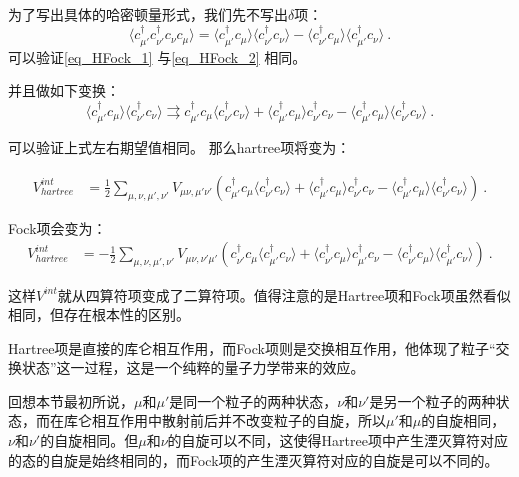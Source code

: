 为了写出具体的哈密顿量形式，我们先不写出$\delta$项：
\begin{equation}\label{eq_HFock_2}
\langle c_{\mu'}^\dagger c_{\nu'}^\dagger c_{\nu} c_{\mu} \rangle = \langle c_{\mu'}^\dagger c_\mu\rangle\langle c_{\nu'}^\dagger c_\nu\rangle-\langle c_{\nu'}^\dagger c_\mu\rangle\langle c_{\mu'}^\dagger c_\nu\rangle~.
\end{equation}
可以验证\autoref{eq_HFock_1} 与\autoref{eq_HFock_2} 相同。

并且做如下变换：
$$\langle c_{\mu'}^\dagger c_\mu\rangle\langle c_{\nu'}^\dagger c_\nu\rangle\rightrightarrows c_{\mu'}^\dagger c_\mu\langle c_{\nu'}^\dagger c_\nu\rangle+\langle c_{\mu'}^\dagger c_\mu\rangle c_{\nu'}^\dagger c_\nu-\langle c_{\mu'}^\dagger c_\mu\rangle\langle c_{\nu'}^\dagger c_\nu\rangle ~.$$

可以验证上式左右期望值相同。
那么hartree项将变为：

\begin{equation}
\begin{aligned}
V^{int}_{hartree}&=\frac{1}{2}\sum\limits_{\mu,\nu,\mu',\nu'}V_{\mu\nu,\mu'\nu'}\left(c_{\mu'}^\dagger c_\mu\langle c_{\nu'}^\dagger c_\nu\rangle+\langle c_{\mu'}^\dagger c_\mu\rangle c_{\nu'}^\dagger c_\nu-\langle c_{\mu'}^\dagger c_\mu\rangle\langle c_{\nu'}^\dagger c_\nu\rangle\right)~.
\end{aligned}
\end{equation}

Fock项会变为：
\begin{equation}
\begin{aligned}
V^{int}_{hartree}&=-\frac{1}{2}\sum\limits_{\mu,\nu,\mu',\nu'}V_{\mu\nu,\nu'\mu'}\left(c_{\nu'}^\dagger c_\mu\langle c_{\mu'}^\dagger c_\nu\rangle+\langle c_{\nu'}^\dagger c_\mu\rangle c_{\mu'}^\dagger c_\nu-\langle c_{\nu'}^\dagger c_\mu\rangle\langle c_{\mu'}^\dagger c_\nu\rangle\right)~.
\end{aligned}
\end{equation}

这样$V^{int}$就从四算符项变成了二算符项。值得注意的是Hartree项和Fock项虽然看似相同，但存在根本性的区别。

Hartree项是直接的库仑相互作用，而Fock项则是交换相互作用，他体现了粒子“交换状态”这一过程，这是一个纯粹的量子力学带来的效应。

回想本节最初所说，$\mu$和$\mu'$是同一个粒子的两种状态，$\nu$和$\nu'$是另一个粒子的两种状态，而在库仑相互作用中散射前后并不改变粒子的自旋，所以$\mu'$和$\mu$的自旋相同，$\nu$和$\nu'$的自旋相同。但$\mu$和$\nu$的自旋可以不同，这使得Hartree项中产生湮灭算符对应的态的自旋是始终相同的，而Fock项的产生湮灭算符对应的自旋是可以不同的。
